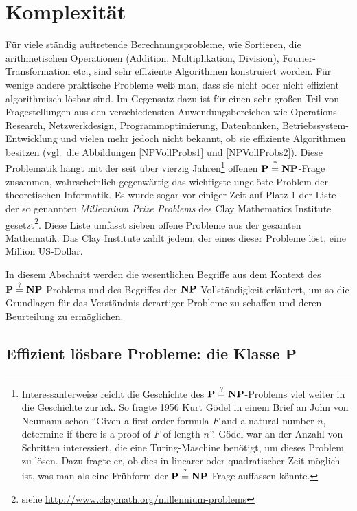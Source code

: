 \section{Komplexität}
\label{KomplexSect}

Für viele ständig auftretende Berechnungsprobleme, wie Sortieren, die
arithmetischen Operationen (Addition, Multiplikation, Division),
Fourier-Transformation etc., sind sehr effiziente Algorithmen
konstruiert worden. Für wenige andere praktische Probleme weiß man,
dass sie nicht oder nicht effizient algorithmisch lösbar sind. Im
Gegensatz dazu ist für einen sehr großen Teil von Fragestellungen aus
den verschiedensten Anwendungsbereichen wie Operations Research,
Netzwerkdesign, Programmoptimierung, Datenbanken,
Betriebssystem-Entwicklung und vielen mehr jedoch nicht bekannt, ob
sie effiziente Algorithmen besitzen (vgl.~die Abbildungen
\ref{NPVollProbs1} und \ref{NPVollProbs2}). Diese Problematik hängt
mit der seit über vierzig Jahren\footnote{Interessanterweise reicht die Geschichte des $\mathbf{P}\stackrel{?}{=}\mathbf{N}\mathbf{P}$-Problems viel weiter in die Geschichte zurück. So fragte 1956 Kurt Gödel in einem Brief an John von Neumann schon "`Given a first-order formula $F$ and a natural number $n$, determine if there is a proof of $F$ of length $n$"'. Gödel war an der Anzahl von Schritten interessiert, die eine Turing-Maschine benötigt, um dieses Problem zu lösen. Dazu fragte er, ob dies in linearer oder quadratischer Zeit möglich ist, was man als eine Frühform der $\mathbf{P}\stackrel{?}{=}\mathbf{N}\mathbf{P}$-Frage auffassen könnte.} offenen $\mathbf{P}\stackrel{?}{=}\mathbf{N}\mathbf{P}$-Frage
zusammen, wahrscheinlich gegenwärtig das wichtigste ungelöste Problem
der theoretischen Informatik. Es wurde sogar vor einiger Zeit auf Platz 1 der
Liste der so genannten \emph{Millennium Prize Problems} des Clay
Mathematics Institute gesetzt\footnote{siehe \url{http://www.claymath.org/millennium-problems}}.  
Diese Liste umfasst sieben offene Probleme aus der gesamten
Mathematik. Das Clay Institute zahlt jedem, der eines dieser Probleme 
löst, eine Million US-Dollar.

In diesem Abschnitt werden die wesentlichen Begriffe aus dem Kontext
des $\mathbf{P}\stackrel{?}{=}\mathbf{N}\mathbf{P}$-Problems und des Begriffes der
$\mathbf{N}\mathbf{P}$-Vollständigkeit erläutert, um so die Grundlagen für das
Verständnis derartiger Probleme zu schaffen und deren Beurteilung zu
ermöglichen.

\subsection{Effizient lösbare Probleme: die Klasse $\mathbf{P}$}

